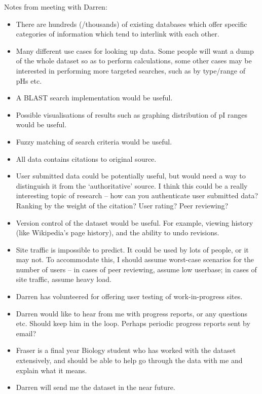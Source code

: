 \noindent
Notes from meeting with Darren:
\begin{itemize}
\item There are hundreds (/thousands) of existing databases which offer specific
  categories of information which tend to interlink with each other.
\item Many different use cases for looking up data. Some people will want a dump
  of the whole dataset so as to perform calculations, some other cases may be
  interested in performing more targeted searches, such as by type/range of pHs
  etc.
\item A BLAST search implementation would be useful.
\item Possible visualisations of results such as graphing distribution of pI
  ranges would be useful.
\item Fuzzy matching of search criteria would be useful.
\item All data contains citations to original source.
\item User submitted data could be potentially useful, but would need a way to
  distinguish it from the ‘authoritative’ source. I think this could be a really
  interesting topic of research – how can you authenticate user submitted data?
  Ranking by the weight of the citation? User rating? Peer reviewing?
\item Version control of the dataset would be useful. For example, viewing
  history (like Wikipedia’s page history), and the ability to undo revisions.
\item Site traffic is impossible to predict. It could be used by lots of people,
  or it may not. To accommodate this, I should assume worst-case scenarios for
  the number of users – in cases of peer reviewing, assume low userbase; in
  cases of site traffic, assume heavy load.
\item Darren has volunteered for offering user testing of work-in-progress
  sites.
\item Darren would like to hear from me with progress reports, or any questions
  etc. Should keep him in the loop. Perhaps periodic progress reports sent by
  email?
\item Fraser is a final year Biology student who has worked with the dataset
  extensively, and should be able to help go through the data with me and
  explain what it means.
\item Darren will send me the dataset in the near future.
\end{itemize}

